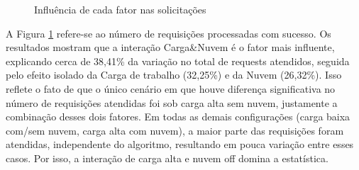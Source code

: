 \begin{figure}[ht!]
    \centering
    \footnotesize

    \caption{Influência de cada fator nas solicitações}
    \label{fig:influence_requests}
\end{figure}
    

A Figura \ref{fig:influence_requests} refere-se ao número de requisições processadas com sucesso. Os resultados mostram que a interação Carga\&Nuvem é o fator mais influente, explicando cerca de 38,41\% da variação no total de requests atendidos, seguida pelo efeito isolado da Carga de trabalho (32,25\%) e da Nuvem (26,32\%). Isso reflete o fato de que o único cenário em que houve diferença significativa no número de requisições atendidas foi sob carga alta sem nuvem, justamente a combinação desses dois fatores. Em todas as demais configurações (carga baixa com/sem nuvem, carga alta com nuvem), a maior parte das requisições foram atendidas, independente do algoritmo, resultando em pouca variação entre esses casos. Por isso, a interação de carga alta e nuvem off domina a estatística.

